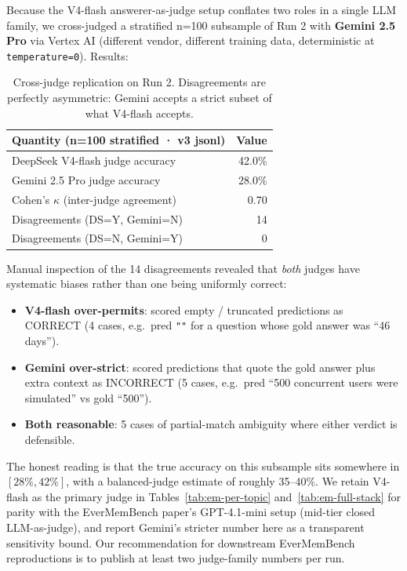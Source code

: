 Because the V4-flash answerer-as-judge setup conflates two roles in a
single LLM family, we cross-judged a stratified n=100 subsample of Run 2
with \textbf{Gemini 2.5 Pro} via Vertex AI (different vendor, different
training data, deterministic at \texttt{temperature=0}). Results:

\begin{table}[h]
\centering
\begin{tabular}{lr}
\toprule
Quantity (n=100 stratified · v3 jsonl)         & Value \\
\midrule
DeepSeek V4-flash judge accuracy               & 42.0\% \\
Gemini 2.5 Pro judge accuracy                  & 28.0\% \\
Cohen's $\kappa$ (inter-judge agreement)       & 0.70 \\
Disagreements (DS=Y, Gemini=N)                 & 14 \\
Disagreements (DS=N, Gemini=Y)                 & 0 \\
\bottomrule
\end{tabular}
\caption{Cross-judge replication on Run 2. Disagreements are perfectly
asymmetric: Gemini accepts a strict subset of what V4-flash accepts.}
\label{tab:em-crossjudge-gemini}
\end{table}

Manual inspection of the 14 disagreements revealed that \emph{both} judges
have systematic biases rather than one being uniformly correct:

\begin{itemize}
\item \textbf{V4-flash over-permits}: scored empty / truncated predictions
as CORRECT (4 cases, e.g.\ pred \texttt{""} for a question whose gold
answer was ``46 days'').
\item \textbf{Gemini over-strict}: scored predictions that quote the gold
answer plus extra context as INCORRECT (5 cases, e.g.\ pred ``500
concurrent users were simulated'' vs gold ``500'').
\item \textbf{Both reasonable}: 5 cases of partial-match ambiguity where
either verdict is defensible.
\end{itemize}

The honest reading is that the true accuracy on this subsample sits
somewhere in $[28\%, 42\%]$, with a balanced-judge estimate of roughly
35--40\%. We retain V4-flash as the primary judge in
Tables~\ref{tab:em-per-topic} and~\ref{tab:em-full-stack} for parity
with the EverMemBench paper's GPT-4.1-mini setup (mid-tier closed
LLM-as-judge), and report Gemini's stricter number here as a transparent
sensitivity bound. Our recommendation for downstream EverMemBench
reproductions is to publish at least two judge-family numbers per run.

